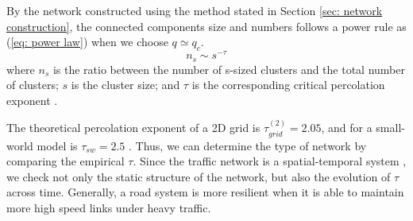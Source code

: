By the network constructed using the method stated in Section \ref{sec: network construction}, the connected components size and numbers follows a power rule as (\ref{eq: power law}) when we choose $q \simeq q_c$. 
\begin{equation} \label{eq: power law}
    n_s \sim s^{-\tau}
\end{equation}
where $n_s$ is the ratio between the number
of s-sized clusters and the total number of clusters; $s$ is the cluster size; and $\tau$ is the corresponding critical percolation exponent \cite{zeng2019switch}. 


The theoretical percolation exponent of a 2D grid is $\tau_{grid}^{(2)} = 2.05$, and for a small-world model is $\tau_{sw} = 2.5$ \cite{zeng2019switch, huang2018critical}. Thus, we can determine the type of network by comparing the empirical $\tau$. Since the traffic network is a spatial-temporal system \cite{zeng2019switch}, we check not only the static structure of the network, but also the evolution of $\tau$ across time. Generally, a road system is more resilient when it is able to maintain more high speed links under heavy traffic.
